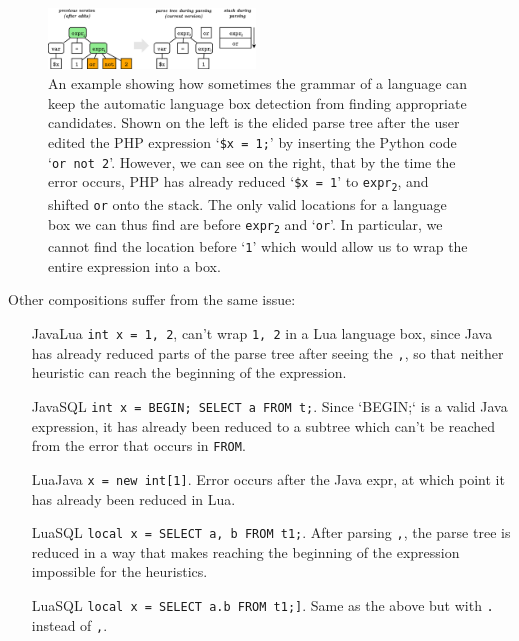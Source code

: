 \documentclass[sigplan,screen]{acmart}\settopmatter{printfolios=true,printccs=false,printacmref=false}
\newcommand{\qtt}[1]{`\texttt{#1}'\xspace}
\begin{document}
\begin{figure}
\begin{center}
\includegraphics[width=0.49\textwidth]{images/limitation_php}
\end{center}
\caption{An example showing how sometimes the grammar of a language can
keep the automatic language box detection from finding appropriate candidates.
Shown on the left is the elided parse tree after the user edited the PHP expression
\qtt{\$x = 1;} by inserting the Python code \qtt{or not 2}. However, we
can see on the right, that by the time the error occurs, PHP has already reduced \qtt{\$x = 1} to \texttt{expr\textsubscript{2}}, and shifted
\texttt{or} onto the stack. The only valid locations for a language
box we can thus find are before \texttt{expr\textsubscript{2}} and \qtt{or}. In particular,
we cannot find the location before \qtt{1} which would allow us to wrap the entire expression
into a box.}
\label{fig_auto_phplimit}
\end{figure}

Other compositions suffer from the same issue:
\begin{itemize}
    \item[JavaLua] \verb|int x = 1, 2|, can't wrap \verb|1, 2| in a Lua
        language box, since Java has already reduced parts of the parse tree
        after seeing the \texttt{,}, so that neither heuristic can reach the
        beginning of the expression.
    \item[JavaSQL] \verb|int x = BEGIN; SELECT a FROM t;|. Since `BEGIN;` is a
        valid Java expression, it has already been reduced to a subtree which
        can't be reached from the error that occurs in \texttt{FROM}.
    \item[LuaJava] \verb|x = new int[1]|. Error occurs after the Java expr, at
        which point it has already been reduced in Lua.
    \item[LuaSQL] \verb|local x = SELECT a, b FROM t1;|. After parsing
        \texttt{,}, the parse tree is reduced in a way that makes reaching the
        beginning of the expression impossible for the heuristics.
    \item[LuaSQL] \verb|local x = SELECT a.b FROM t1;]|. Same as the above but
        with \texttt{.} instead of \texttt{,}.
\end{itemize}
\end{document}
